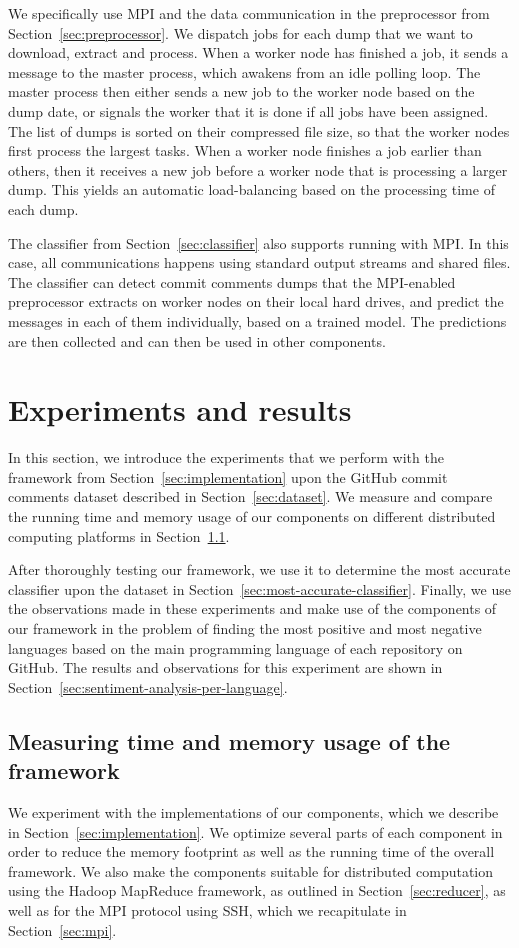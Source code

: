 \documentclass{article}
\begin{document}
We specifically use MPI and the data communication in the preprocessor from 
Section~\ref{sec:preprocessor}. We dispatch jobs for each dump that we want to 
download, extract and process. When a worker node has finished a job, it sends 
a message to the master process, which awakens from an idle polling loop. The 
master process then either sends a new job to the worker node based on the dump 
date, or signals the worker that it is done if all jobs have been assigned. The 
list of dumps is sorted on their compressed file size, so that the worker nodes 
first process the largest tasks. When a worker node finishes a job earlier than 
others, then it receives a new job before a worker node that is processing a
larger dump. This yields an automatic load-balancing based on the processing
time of each dump.

The classifier from Section~\ref{sec:classifier} also supports running with 
MPI\@. In this case, all communications happens using standard output streams
and shared files. The classifier can detect commit comments dumps that the 
MPI-enabled preprocessor extracts on worker nodes on their local hard drives, 
and predict the messages in each of them individually, based on a trained 
model. The predictions are then collected and can then be used in other 
components.

\section{Experiments and results}\label{sec:experiments-and-results}
In this section, we introduce the experiments that we perform with the 
framework from Section~\ref{sec:implementation} upon the GitHub commit comments 
dataset described in Section~\ref{sec:dataset}. We measure and compare the 
running time and memory usage of our components on different distributed 
computing platforms in Section~\ref{sec:time-and-memory-usage}.

After thoroughly testing our framework, we use it to determine the most 
accurate classifier upon the dataset in 
Section~\ref{sec:most-accurate-classifier}. Finally, we use the observations 
made in these experiments and make use of the components of our framework in 
the problem of finding the most positive and most negative languages based on 
the main programming language of each repository on GitHub. The results and 
observations for this experiment are shown in 
Section~\ref{sec:sentiment-analysis-per-language}.

\subsection{Measuring time and memory usage of the framework}\label{sec:time-and-memory-usage}
We experiment with the implementations of our components, which we describe in 
Section~\ref{sec:implementation}. We optimize several parts of each component 
in order to reduce the memory footprint as well as the running time of the 
overall framework. We also make the components suitable for distributed 
computation using the Hadoop MapReduce framework, as outlined in 
Section~\ref{sec:reducer}, as well as for the MPI protocol using SSH, which we 
recapitulate in Section~\ref{sec:mpi}.
\end{document}
